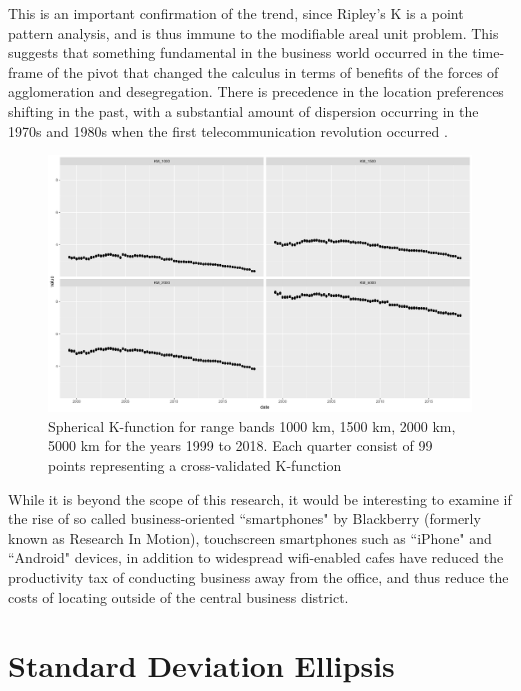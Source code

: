 This is an important confirmation of the trend, since Ripley's K is a point pattern analysis, and is thus immune to the  modifiable areal unit problem.  This suggests that something fundamental in the business world occurred in the time-frame of the pivot that changed the calculus in terms of benefits of the forces of agglomeration and desegregation.  There is precedence in the location preferences shifting in the past, with a substantial amount of dispersion occurring in the 1970s and 1980s when the first telecommunication revolution occurred \citep{bodenmanfirm2000}.
\begin{figure}[h]
	\centering
	\includegraphics[width=.9\textwidth]{Figures/ChapterIII/Cross_val_1000_5000.pdf} 
	\caption[Spherical K-function for Range Bands 1000km to 5000km]{Spherical K-function for range bands 1000 km, 1500 km, 2000 km, 5000 km for the years 1999 to 2018. Each quarter consist of 99 points representing a cross-validated K-function}
	\label{fig:Kfunction1000to5000}
\end{figure}


While it is beyond the scope of this research, it would be interesting to examine if the rise of so called business-oriented ``smartphones" by Blackberry (formerly known as Research In Motion), touchscreen smartphones such as ``iPhone" and ``Android" devices, in addition to widespread wifi-enabled cafes have reduced the productivity tax of conducting business away from the office, and thus reduce the costs of locating outside of the central business district.   


\section{Standard Deviation Ellipsis}

